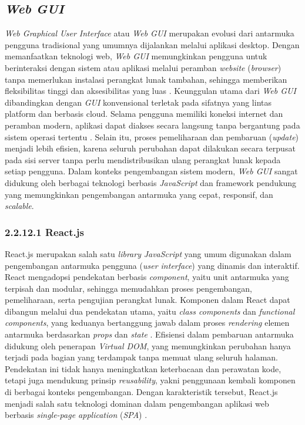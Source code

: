 \subsection{\emph{Web GUI}}

\emph{Web Graphical User Interface} atau \emph{Web GUI} merupakan evolusi dari antarmuka pengguna tradisional yang umumnya dijalankan melalui aplikasi desktop. Dengan memanfaatkan teknologi web, \emph{Web GUI} memungkinkan pengguna untuk berinteraksi dengan sistem atau aplikasi melalui peramban \emph{website} (\emph{browser}) tanpa memerlukan instalasi perangkat lunak tambahan, sehingga memberikan fleksibilitas tinggi dan aksesibilitas yang luas \cite{krug2014dont}. Keunggulan utama dari \emph{Web GUI} dibandingkan dengan \emph{GUI} konvensional terletak pada sifatnya yang lintas platform dan berbasis cloud. Selama pengguna memiliki koneksi internet dan peramban modern, aplikasi dapat diakses secara langsung tanpa bergantung pada sistem operasi tertentu \cite{murugesan2007web}. Selain itu, proses pemeliharaan dan pembaruan (\emph{update}) menjadi lebih efisien, karena seluruh perubahan dapat dilakukan secara terpusat pada sisi server tanpa perlu mendistribusikan ulang perangkat lunak kepada setiap pengguna. Dalam konteks pengembangan sistem modern, \emph{Web GUI} sangat didukung oleh berbagai teknologi berbasis \emph{JavaScript} dan framework pendukung yang memungkinkan pengembangan antarmuka yang cepat, responsif, dan \emph{scalable}. 

\subsubsection{2.2.12.1 React.js}

React.js merupakan salah satu \emph{library} \emph{JavaScript} yang umum digunakan dalam pengembangan antarmuka pengguna (\emph{user interface}) yang dinamis dan interaktif. React mengadopsi pendekatan berbasis \emph{component}, yaitu unit antarmuka yang terpisah dan modular, sehingga memudahkan proses pengembangan, pemeliharaan, serta pengujian perangkat lunak. Komponen dalam React dapat dibangun melalui dua pendekatan utama, yaitu \emph{class components} dan \emph{functional components}, yang keduanya bertanggung jawab dalam proses \emph{rendering} elemen antarmuka berdasarkan \emph{props} dan \emph{state} \cite{Panjaitan2021}. Efisiensi dalam pembaruan antarmuka didukung oleh penerapan \emph{Virtual DOM}, yang memungkinkan perubahan hanya terjadi pada bagian yang terdampak tanpa memuat ulang seluruh halaman. Pendekatan ini tidak hanya meningkatkan keterbacaan dan perawatan kode, tetapi juga mendukung prinsip \emph{reusability}, yakni penggunaan kembali komponen di berbagai konteks pengembangan. Dengan karakteristik tersebut, React.js menjadi salah satu teknologi dominan dalam pengembangan aplikasi web berbasis \emph{single-page application} (\emph{SPA}) \cite{Panjaitan2021}.

